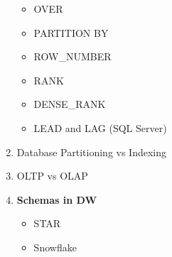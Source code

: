 \documentclass[11pt]{article}
\begin{document}
\begin{enumerate}
\begin{itemize}
	\item OVER
	\item PARTITION BY
	\item ROW\_NUMBER
	\item RANK
	\item DENSE\_RANK
	\item LEAD and LAG (SQL Server)
\end{itemize}
\item Database Partitioning vs Indexing
\item OLTP vs OLAP
\item \textbf{Schemas in DW}
\begin{itemize}
	\item STAR
	\item Snowflake
\end{itemize}
\end{enumerate}
\end{document}
